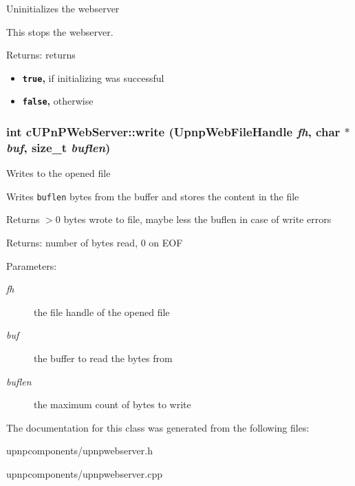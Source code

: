 Uninitializes the webserver

This stops the webserver.

\begin{Desc}
\item[Returns:]returns\begin{itemize}
\item {\bf {\tt true},} if initializing was successful\item {\bf {\tt false},} otherwise \end{itemize}
\end{Desc}
\hypertarget{classcUPnPWebServer_46e282288394c8ba37e9d4846944c6a4}{
\subsubsection[{write}]{\setlength{\rightskip}{0pt plus 5cm}int cUPnPWebServer::write (UpnpWebFileHandle {\em fh}, \/  char $\ast$ {\em buf}, \/  size\_\-t {\em buflen})}}
\label{classcUPnPWebServer_46e282288394c8ba37e9d4846944c6a4}


Writes to the opened file

Writes {\tt buflen} bytes from the buffer and stores the content in the file

Returns $>$0 bytes wrote to file, maybe less the buflen in case of write errors

\begin{Desc}
\item[Returns:]number of bytes read, 0 on EOF \end{Desc}
\begin{Desc}
\item[Parameters:]
\begin{description}
\item[{\em fh}]the file handle of the opened file \item[{\em buf}]the buffer to read the bytes from \item[{\em buflen}]the maximum count of bytes to write \end{description}
\end{Desc}


The documentation for this class was generated from the following files:\begin{CompactItemize}
\item 
upnpcomponents/upnpwebserver.h\item 
upnpcomponents/upnpwebserver.cpp\end{CompactItemize}
